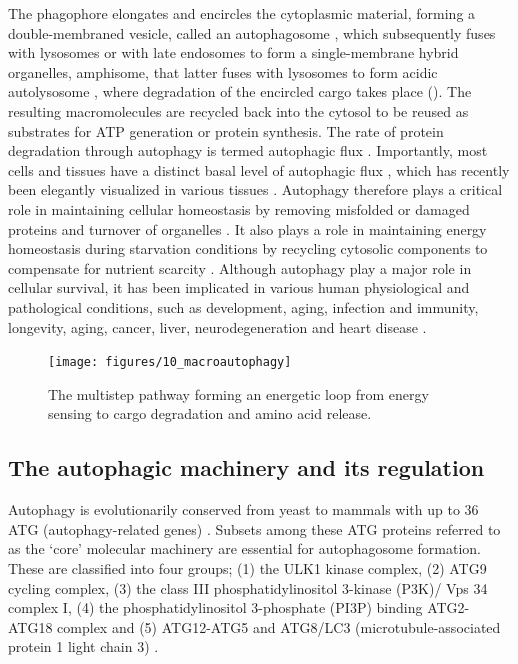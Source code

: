 The phagophore elongates and encircles the cytoplasmic material, forming a double-membraned vesicle, called an autophagosome \citep{Cai2012,Levine2008}, which subsequently fuses with lysosomes or with late endosomes to form a single-membrane hybrid organelles, amphisome, that latter fuses with lysosomes to form acidic autolysosome \citep{Cai2012,Nixon2011,sarkar2013}, where degradation of the encircled cargo takes place (). The resulting macromolecules are recycled back into the cytosol to be reused as substrates for ATP generation or protein synthesis. The rate of protein degradation through autophagy is termed autophagic flux \citep{klionsky2016,loos2014}. Importantly, most cells and tissues have a distinct basal level of autophagic flux \citep{Mizushima2004a}, which has recently been elegantly visualized in various tissues \citep{Kaizuka2016}. Autophagy therefore plays a critical role in maintaining cellular homeostasis by removing misfolded or damaged proteins and turnover of organelles \citep{Levine2008}. It also plays a role in maintaining energy homeostasis during starvation conditions by recycling cytosolic components to compensate for nutrient scarcity \citep{Levine2008,Loos2009}. Although autophagy play a major role in cellular survival, it has been implicated in various human physiological and pathological conditions, such as development, aging, infection and immunity, longevity, aging, cancer, liver, neurodegeneration and heart disease \citep{Meijer2006,Mizushima2008,Ravikumar2010b,sarkar2013}.

\begin{figure}[h!]
  \texttt{[image: figures/10\_macroautophagy]}
  \caption{The multistep pathway forming an energetic loop from energy sensing to cargo degradation and amino acid release.}
  \label{fig:10_macroautophagy}
\end{figure}

\subsection{The autophagic machinery and its regulation}
Autophagy is evolutionarily conserved from yeast to mammals with up to 36 ATG (autophagy-related genes) \citep{Thumm1994,Tsukada1993,Klionsky2007,Mizushima2010}. Subsets among these ATG proteins referred to as the ‘core’ molecular machinery are essential for autophagosome formation. These are classified into four groups; (1) the ULK1 kinase complex, (2) ATG9 cycling complex, (3) the class III phosphatidylinositol 3-kinase (P3K)/ Vps 34 complex I, (4) the phosphatidylinositol 3-phosphate (PI3P) binding ATG2-ATG18 complex and (5) ATG12-ATG5 and ATG8/LC3 (microtubule-associated protein 1 light chain 3) \citep{Feng2014,Yang2010}.

